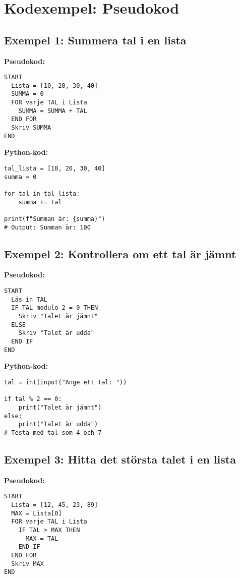 \section{Kodexempel: Pseudokod}
\label{examples:psuedocode}
\subsection*{Exempel 1: Summera tal i en lista}

\textbf{Pseudokod:}
\begin{verbatim}
START
  Lista = [10, 20, 30, 40]
  SUMMA = 0
  FOR varje TAL i Lista
    SUMMA = SUMMA + TAL
  END FOR
  Skriv SUMMA
END
\end{verbatim}

\textbf{Python-kod:}
\begin{lstlisting}[title=Summera tal i en lista]
tal_lista = [10, 20, 30, 40]
summa = 0

for tal in tal_lista:
    summa += tal

print(f"Summan är: {summa}")
# Output: Summan är: 100
\end{lstlisting}

\subsection*{Exempel 2: Kontrollera om ett tal är jämnt}

\textbf{Pseudokod:}
\begin{verbatim}
START
  Läs in TAL
  IF TAL modulo 2 = 0 THEN
    Skriv "Talet är jämnt"
  ELSE
    Skriv "Talet är udda"
  END IF
END
\end{verbatim}

\textbf{Python-kod:}
\begin{lstlisting}[title=Kontrollera om ett tal är jämnt]
tal = int(input("Ange ett tal: "))

if tal % 2 == 0:
    print("Talet är jämnt")
else:
    print("Talet är udda")
# Testa med tal som 4 och 7
\end{lstlisting}

\subsection*{Exempel 3: Hitta det största talet i en lista}

\textbf{Pseudokod:}
\begin{verbatim}
START
  Lista = [12, 45, 23, 89]
  MAX = Lista[0]
  FOR varje TAL i Lista
    IF TAL > MAX THEN
      MAX = TAL
    END IF
  END FOR
  Skriv MAX
END
\end{verbatim}

